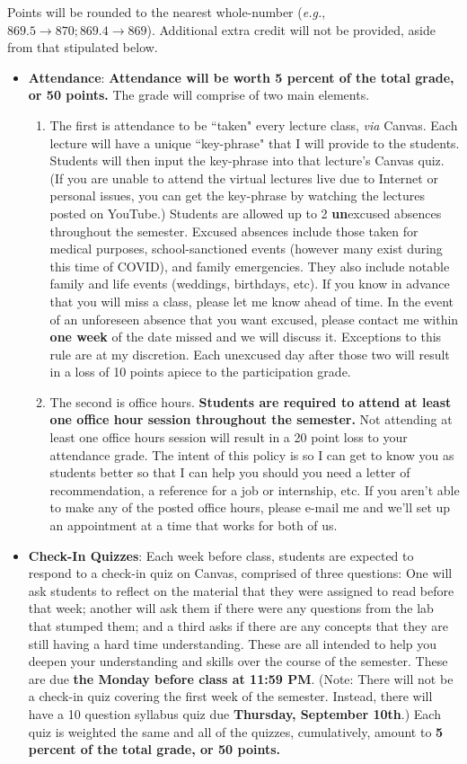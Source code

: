 \documentclass[11pt]{article}
\begin{document}
Points will be rounded to the nearest whole-number (\textit{e.g.}, $869.5 \rightarrow 870; 869.4 \rightarrow 869$). Additional extra credit will not be provided, aside from that stipulated below.
\begin{itemize}
	\item \textbf{Attendance}: \textbf{Attendance will be worth 5 percent of the total grade, or 50 points.} The grade will comprise of two main elements. 
	\begin{enumerate}
	\item The first is attendance to be ``taken" every lecture class, \textit{via} Canvas. Each lecture will have a unique ``key-phrase" that I will provide to the students. Students will then input the key-phrase into that lecture's Canvas quiz. (If you are unable to attend the virtual lectures live due to Internet or personal issues, you can get the key-phrase by watching the lectures posted on YouTube.) Students are allowed up to 2 \textbf{un}excused absences throughout the semester. Excused absences include those taken for medical purposes, school-sanctioned events (however many exist during this time of COVID), and family emergencies. They also include notable family and life events (weddings, birthdays, etc). If you know in advance that you will miss a class, please let me know ahead of time. In the event of an unforeseen absence that you want excused, please contact me within \textbf{one week} of the date missed and we will discuss it. Exceptions to this rule are at my discretion. Each unexcused day after those two will result in a loss of 10 points apiece to the participation grade.
	\item The second is office hours. \textbf{Students are required to attend at least one office hour session throughout the semester.} Not attending at least one office hours session will result in a 20 point loss to your attendance grade. The intent of this policy is so I can get to know you as students better so that I can help you should you need a letter of recommendation, a reference for a job or internship, etc. If you aren't able to make any of the posted office hours, please e-mail me and we'll set up an appointment at a time that works for both of us.  
	\end{enumerate}	 
	\item \textbf{Check-In Quizzes}: Each week before class, students are expected to respond to a check-in quiz on Canvas, comprised of three questions: One will ask students to reflect on the material that they were assigned to read before that week; another will ask them if there were any questions from the lab that stumped them; and a third asks if there are any concepts that they are still having a hard time understanding. These are all intended to help you deepen your understanding and skills over the course of the semester. These are due \textbf{the Monday before class at 11:59 PM}. (Note: There will not be a check-in quiz covering the first week of the semester. Instead, there  will have a 10 question syllabus quiz due \textbf{Thursday, September 10th}.) Each quiz is weighted the same and all of the quizzes, cumulatively, amount to \textbf{5 percent of the total grade, or 50 points.} 

\end{itemize}
\end{document}
